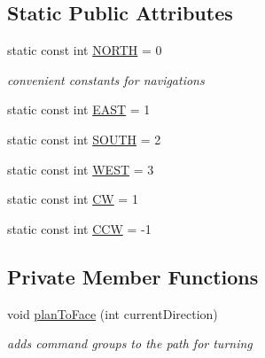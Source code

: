 \subsection*{Static Public Attributes}
\begin{DoxyCompactItemize}
\item 
static const int \hyperlink{classPathPlanner_a701384da34d065d821a936893c5ddd8d}{N\-O\-R\-T\-H} = 0
\begin{DoxyCompactList}\small\item\em convenient constants for navigations \end{DoxyCompactList}\item 
static const int \hyperlink{classPathPlanner_a45399b95a063acdff309e376ccac0fa2}{E\-A\-S\-T} = 1
\item 
static const int \hyperlink{classPathPlanner_a0d74731cd6e012a8724689f8c8f6492e}{S\-O\-U\-T\-H} = 2
\item 
static const int \hyperlink{classPathPlanner_aac8f18908f761050a3801acd476ea0ce}{W\-E\-S\-T} = 3
\item 
static const int \hyperlink{classPathPlanner_af08949a4cd572b26f4f37ff441191b3a}{C\-W} = 1
\item 
static const int \hyperlink{classPathPlanner_ab08a4cb0f762a4401a804bf0ce1bbbe6}{C\-C\-W} = -\/1
\end{DoxyCompactItemize}
\subsection*{Private Member Functions}
\begin{DoxyCompactItemize}
\item 
void \hyperlink{classPathPlanner_a435470288f6e2b5f99ce590db0bfc5db}{plan\-To\-Face} (int current\-Direction)
\begin{DoxyCompactList}\small\item\em adds command groups to the path for turning \end{DoxyCompactList}\end{DoxyCompactItemize}
